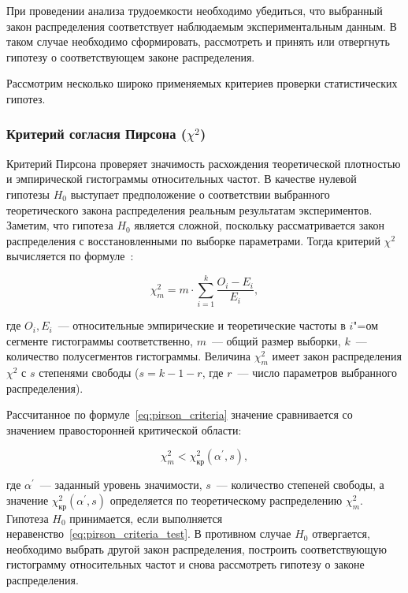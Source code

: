 \documentclass[a4paper, article, 12pt]{extarticle}
\begin{document}
При проведении анализа трудоемкости необходимо убедиться, что выбранный закон распределения соответствует наблюдаемым экспериментальным данным. В таком случае необходимо сформировать, рассмотреть и принять или отвергнуть гипотезу о соответствующем законе распределения.

Рассмотрим несколько широко применяемых критериев проверки статистических гипотез.

\subsubsection{Критерий согласия Пирсона ($\chi^2$)}\label{sec:pirson_criteria}

Критерий Пирсона проверяет значимость расхождения теоретической плотностью и эмпирической гистограммы относительных частот. В качестве нулевой гипотезы $H_0$ выступает предположение о соответствии выбранного теоретического закона распределения реальным результатам экспериментов. Заметим, что гипотеза $H_0$ является сложной, поскольку рассматривается закон распределения с восстановленными по выборке параметрами. Тогда критерий $\chi^2$ вычисляется по формуле~\cite{koroluk}:

\begin{equation}\label{eq:pirson_criteria}
	\chi_m^2 = m \cdot \sum_{i=1}^{k}{\frac{O_i - E_i}{E_i}},
\end{equation}

\noindent где $O_i, E_i$~--- относительные эмпирические и теоретические частоты в $i$"=ом сегменте гистограммы соответственно, $m$~--- общий размер выборки, $k$~--- количество полусегментов гистограммы. Величина $\chi_m^2$ имеет закон распределения $\chi^2$ с $s$ степенями свободы ($s = k - 1 - r$, где $r$~--- число параметров выбранного распределения).

Рассчитанное по формуле~\eqref{eq:pirson_criteria} значение сравнивается со значением правосторонней критической области:

\begin{equation}\label{eq:pirson_criteria_test}
	\chi_m^2 < \chi_\text{кр}^2(\alpha^{'}, s),
\end{equation}

\noindent где $\alpha^{'}$~--- заданный уровень значимости, $s$~--- количество степеней свободы, а значение $\chi_\text{кр}^2(\alpha^{'}, s)$ определяется по теоретическому распределению $\chi_m^2$. Гипотеза $H_0$ принимается, если выполняется неравенство~\eqref{eq:pirson_criteria_test}. В противном случае $H_0$ отвергается, необходимо выбрать другой закон распределения, построить соответствующую гистограмму относительных частот и снова рассмотреть гипотезу о законе распределения.
\end{document}
